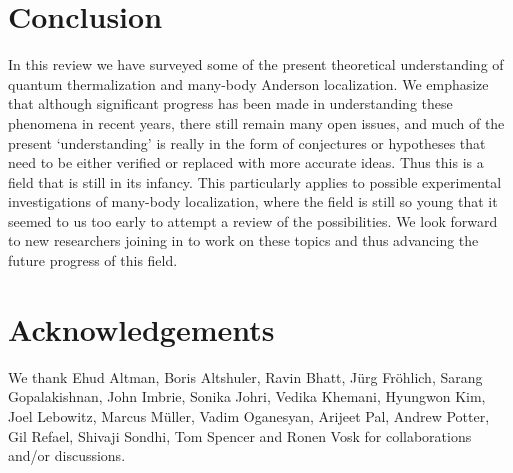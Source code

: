 \documentclass[amsmath,onecolumn, superscriptaddress,preprint,aps]{revtex4}
\begin{document}
\label{transition}

\section{Conclusion}
In this review we have surveyed some of the present theoretical understanding of quantum thermalization and many-body Anderson localization.  We emphasize that although significant progress has been made in understanding these phenomena in recent years, there still remain many open issues, and much of the present `understanding' is really in the form of conjectures or hypotheses that need to be either verified or replaced with more accurate ideas.  Thus
this is a field that is still in its infancy.  This particularly applies to possible experimental investigations of many-body localization,
where the field is still so young that it seemed to us too early to attempt a review of the possibilities.
We look forward to new researchers joining in to work on these topics and thus advancing the future progress of this field.

\section{Acknowledgements}

We thank Ehud Altman, Boris Altshuler, Ravin Bhatt, J\"urg Fr\"ohlich, Sarang Gopalakishnan, John Imbrie, Sonika Johri, Vedika Khemani, Hyungwon Kim, Joel Lebowitz, Marcus M\"uller, Vadim Oganesyan, Arijeet Pal, Andrew Potter, Gil Refael, Shivaji Sondhi, Tom Spencer and Ronen Vosk for collaborations and/or discussions.
\end{document}
